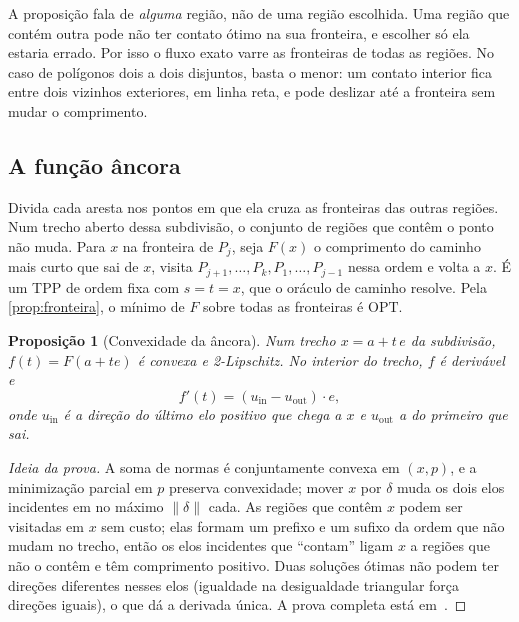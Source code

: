 \documentclass[11pt,a4paper]{article}
\theoremstyle{plain}\newtheorem{proposicao}{Proposição}
\theoremstyle{definition}\newtheorem{definicao}{Definição}
\theoremstyle{plain}\newtheorem{teorema}{Teorema}
\theoremstyle{plain}\newtheorem{lema}{Lema}
\newcommand{\norm}[1]{\lVert#1\rVert}
\newcommand{\OPT}{\mathrm{OPT}}
\begin{document}
A proposição fala de \emph{alguma} região, não de uma região escolhida. Uma região que contém outra pode não ter contato ótimo na sua fronteira, e escolher só ela estaria errado. Por isso o fluxo exato varre as fronteiras de todas as regiões. No caso de polígonos dois a dois disjuntos, basta o menor: um contato interior fica entre dois vizinhos exteriores, em linha reta, e pode deslizar até a fronteira sem mudar o comprimento.

\subsection{A função âncora}\label{sec:funcaoancora}
Divida cada aresta nos pontos em que ela cruza as fronteiras das outras regiões. Num trecho aberto dessa subdivisão, o conjunto de regiões que contêm o ponto não muda. Para \(x\) na fronteira de \(P_j\), seja \(F(x)\) o comprimento do caminho mais curto que sai de \(x\), visita \(P_{j+1},\dots,P_k,P_1,\dots,P_{j-1}\) nessa ordem e volta a \(x\). É um TPP de ordem fixa com \(s=t=x\), que o oráculo de caminho resolve. Pela \cref{prop:fronteira}, o mínimo de \(F\) sobre todas as fronteiras é \(\OPT\).

\begin{proposicao}[Convexidade da âncora]\label{prop:ancora}
Num trecho \(x=a+t\,e\) da subdivisão, \(f(t)=F(a+te)\) é convexa e 2-Lipschitz. No interior do trecho, \(f\) é derivável e
\begin{equation}\label{eq:derivada}
f'(t)=(u_{\text{in}}-u_{\text{out}})\cdot e,
\end{equation}
onde \(u_{\text{in}}\) é a direção do último elo positivo que chega a \(x\) e \(u_{\text{out}}\) a do primeiro que sai.
\end{proposicao}
\begin{proof}[Ideia da prova]
A soma de normas é conjuntamente convexa em \((x,p)\), e a minimização parcial em \(p\) preserva convexidade; mover \(x\) por \(\delta\) muda os dois elos incidentes em no máximo \(\norm\delta\) cada. As regiões que contêm \(x\) podem ser visitadas em \(x\) sem custo; elas formam um prefixo e um sufixo da ordem que não mudam no trecho, então os elos incidentes que ``contam'' ligam \(x\) a regiões que não o contêm e têm comprimento positivo. Duas soluções ótimas não podem ter direções diferentes nesses elos (igualdade na desigualdade triangular força direções iguais), o que dá a derivada única. A prova completa está em~\cite{ciclo}.
\end{proof}
\end{document}
